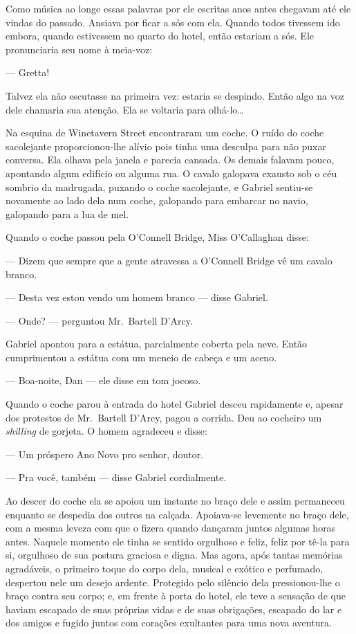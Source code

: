 Como música ao longe essas palavras por ele escritas anos antes chegavam até
ele vindas do passado.  Ansiava por ficar a sós com ela.  Quando todos tivessem
ido embora, quando estivessem no quarto do hotel, então estariam a sós.  Ele
pronunciaria seu nome à meia-voz:

--- Gretta!

Talvez ela não escutasse na primeira vez: estaria se despindo.  Então algo na
voz dele chamaria sua atenção.  Ela se voltaria para olhá-lo\ldots{}

Na esquina de Winetavern Street encontraram um coche.  O ruído do coche
sacolejante proporcionou-lhe alívio pois tinha uma desculpa para não puxar
conversa.  Ela olhava pela janela e parecia cansada.  Os demais falavam pouco,
apontando algum edifício ou alguma rua.  O cavalo galopava exausto sob o céu
sombrio da madrugada, puxando o coche sacolejante, e Gabriel sentiu-se
novamente ao lado dela num coche, galopando para embarcar no navio, galopando
para a lua de mel.

Quando o coche passou pela O’Connell Bridge, Miss O’Callaghan disse:

--- Dizem que sempre que a gente atravessa a O’Connell Bridge vê um cavalo
branco.

--- Desta vez estou vendo um homem branco --- disse Gabriel.

--- Onde? --- perguntou Mr.~Bartell D’Arcy.

Gabriel apontou para a estátua, parcialmente coberta pela neve.  Então
cumprimentou a estátua com um meneio de cabeça e um aceno.

--- Boa-noite, Dan --- ele disse em tom jocoso.

Quando o coche parou à entrada do hotel Gabriel desceu rapidamente e, apesar
dos protestos de Mr.~Bartell D’Arcy, pagou a corrida.  Deu ao cocheiro um
\textit{shilling} de gorjeta.  O homem agradeceu e disse:

--- Um próspero Ano Novo pro senhor, doutor.

--- Pra você, também --- disse Gabriel cordialmente.

Ao descer do coche ela se apoiou um instante no braço dele e assim permaneceu
enquanto se despedia dos outros na calçada.  Apoiava-se levemente no braço
dele, com a mesma leveza com que o fizera quando dançaram juntos algumas horas
antes.  Naquele momento ele tinha se sentido orgulhoso e feliz, feliz por tê-la
para si, orgulhoso de sua postura graciosa e digna.  Mas agora, após tantas
memórias agradáveis, o primeiro toque do corpo dela, musical e exótico e
perfumado, despertou nele um desejo ardente.  Protegido pelo silêncio dela
pressionou-lhe o braço contra seu corpo; e, em frente à porta do hotel, ele
teve a sensação de que haviam escapado de suas próprias vidas e de suas
obrigações, escapado do lar e dos amigos e fugido juntos com corações
exultantes para uma nova aventura.

